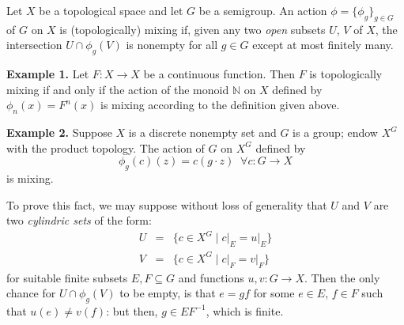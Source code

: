\documentclass[12pt]{article}
\begin{document}
\newcommand{\restrict}[2]{\left.{#1}\right|_{#2}}

Let $X$ be a topological space and let $G$ be a semigroup.
An action $\phi=\{\phi_g\}_{g \in G}$ of $G$ on $X$ is (topologically) mixing
if, given any two \emph{open} subsets $U$, $V$ of $X$,
the intersection $U \cap \phi_g(V)$ is nonempty
for all $g \in G$ except at most finitely many.

\medskip

\textbf{Example 1.}
Let $F : X \to X$ be a continuous function.
Then $F$ is topologically mixing if and only if
the action of the monoid $\mathbb{N}$ on $X$
defined by $\phi_n(x) = F^n(x)$
is mixing according to the definition given above.

\medskip

\textbf{Example 2.}
Suppose $X$ is a discrete nonempty set and $G$ is a group;
endow $X^G$ with the product topology.
The action of $G$ on $X^G$ defined by
\begin{displaymath}
\phi_g(c)(z) = c(g \cdot z) \;\; \forall c : G \to X
\end{displaymath}
is mixing.

To prove this fact,
we may suppose without loss of generality
that $U$ and $V$ are two \emph{cylindric sets}
of the form:
\begin{eqnarray*}
U & = & \{ c \in X^G \mid \restrict{c}{E} = \restrict{u}{E} \} \\
V & = & \{ c \in X^G \mid \restrict{c}{F} = \restrict{v}{F} \}
\end{eqnarray*}
for suitable finite subsets $E,F \subseteq G$ and functions $u,v : G \to X$.
Then the only chance for $U \cap \phi_g(V)$ to be empty,
is that $e = gf$ for some $e \in E$, $f \in F$
such that $u(e) \neq v(f)$:
but then, $g \in EF^{-1}$, which is finite.
\end{document}
